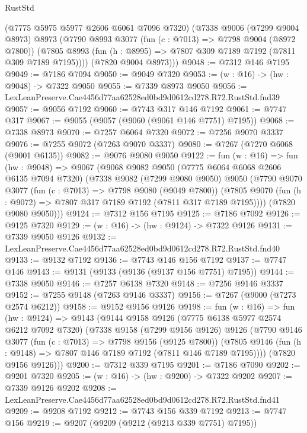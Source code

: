 \begin{lexlean}{RustStd}
\begin{coremodule}
      (@7775 @5975 @5977 @2606 @6061 @7096 @7320)
      (@7338
        @9006
        (@7299 @9004 @8973)
        @8973
        (@7790
          @8993
          @3077
          (fun (c : @7013) => @7798 @9004 (@8972 @7800))
          (@7805 @8993 (fun (h : @8995) => @7807 @309 @7189 @7192 (@7811 @309 @7189 @7195))))
        (@7820 @9004 @8973)))
@9048 := @7312 @146 @7195
@9049 := @7186 @7094
@9050 := @9049 @7320
@9053 := (w : @16) -> (hw : @9048) -> @7322 @9050
@9055 := @7339 @8973 @9050
@9056 := LexLeanPreserve.Cae4456d77aa62528ed0bd9d0612cd278.R72.RustStd.fnd39
@9057 := @9056 @7192
@9060 := @7743 @317 @146 @7192
@9061 := @7747 @317
@9067 := @9055 (@9057 (@9060 (@9061 @146 @7751) @7195))
@9068 := @7338 @8973
@9070 := @7257 @6064 @7320
@9072 := @7256 @9070 @3337
@9076 := @7255 @9072 (@7263 @9070 @3337)
@9080 := @7267 (@7270 @6068 (@9001 @6135))
@9082 := @9076 @9080 @9050
@9122 := fun (w : @16) =>
  fun (hw : @9048) =>
  @9067
    (@9068
      @9082
      @9050
      (@7775 @6064 @6068 @2606 @6135 @7094 @7320)
      (@7338
        @9082
        (@7299 @9080 @9050)
        @9050
        (@7790
          @9070
          @3077
          (fun (c : @7013) => @7798 @9080 (@9049 @7800))
          (@7805 @9070 (fun (h : @9072) => @7807 @317 @7189 @7192 (@7811 @317 @7189 @7195))))
        (@7820 @9080 @9050)))
@9124 := @7312 @156 @7195
@9125 := @7186 @7092
@9126 := @9125 @7320
@9129 := (w : @16) -> (hw : @9124) -> @7322 @9126
@9131 := @7339 @9050 @9126
@9132 := LexLeanPreserve.Cae4456d77aa62528ed0bd9d0612cd278.R72.RustStd.fnd40
@9133 := @9132 @7192
@9136 := @7743 @146 @156 @7192
@9137 := @7747 @146
@9143 := @9131 (@9133 (@9136 (@9137 @156 @7751) @7195))
@9144 := @7338 @9050
@9146 := @7257 @6138 @7320
@9148 := @7256 @9146 @3337
@9152 := @7255 @9148 (@7263 @9146 @3337)
@9156 := @7267 (@9000 (@7273 @2574 @6212))
@9158 := @9152 @9156 @9126
@9198 := fun (w : @16) =>
  fun (hw : @9124) =>
  @9143
    (@9144
      @9158
      @9126
      (@7775 @6138 @5977 @2574 @6212 @7092 @7320)
      (@7338
        @9158
        (@7299 @9156 @9126)
        @9126
        (@7790
          @9146
          @3077
          (fun (c : @7013) => @7798 @9156 (@9125 @7800))
          (@7805 @9146 (fun (h : @9148) => @7807 @146 @7189 @7192 (@7811 @146 @7189 @7195))))
        (@7820 @9156 @9126)))
@9200 := @7312 @339 @7195
@9201 := @7186 @7090
@9202 := @9201 @7320
@9205 := (w : @16) -> (hw : @9200) -> @7322 @9202
@9207 := @7339 @9126 @9202
@9208 := LexLeanPreserve.Cae4456d77aa62528ed0bd9d0612cd278.R72.RustStd.fnd41
@9209 := @9208 @7192
@9212 := @7743 @156 @339 @7192
@9213 := @7747 @156
@9219 := @9207 (@9209 (@9212 (@9213 @339 @7751) @7195))

\end{coremodule}
\end{lexlean}
